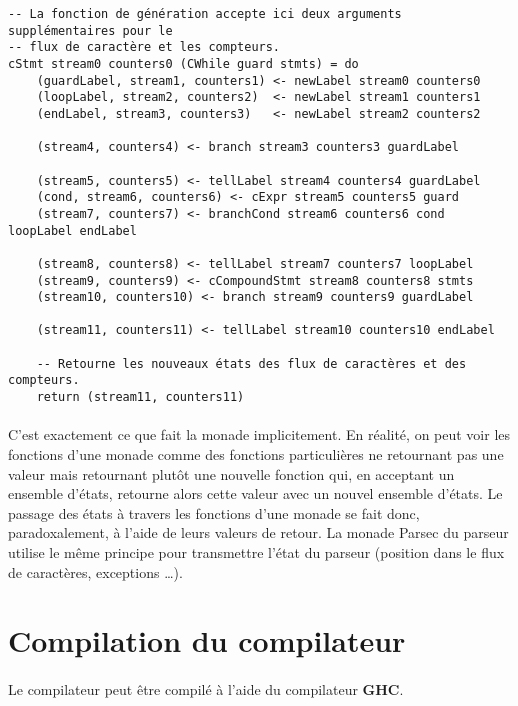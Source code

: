 \documentclass[a4paper]{article}
\begin{document}
    \begin{verbatim}
-- La fonction de génération accepte ici deux arguments supplémentaires pour le
-- flux de caractère et les compteurs.
cStmt stream0 counters0 (CWhile guard stmts) = do
    (guardLabel, stream1, counters1) <- newLabel stream0 counters0
    (loopLabel, stream2, counters2)  <- newLabel stream1 counters1
    (endLabel, stream3, counters3)   <- newLabel stream2 counters2

    (stream4, counters4) <- branch stream3 counters3 guardLabel

    (stream5, counters5) <- tellLabel stream4 counters4 guardLabel
    (cond, stream6, counters6) <- cExpr stream5 counters5 guard
    (stream7, counters7) <- branchCond stream6 counters6 cond loopLabel endLabel

    (stream8, counters8) <- tellLabel stream7 counters7 loopLabel
    (stream9, counters9) <- cCompoundStmt stream8 counters8 stmts
    (stream10, counters10) <- branch stream9 counters9 guardLabel

    (stream11, counters11) <- tellLabel stream10 counters10 endLabel

    -- Retourne les nouveaux états des flux de caractères et des compteurs.
    return (stream11, counters11)
    \end{verbatim}

    \paragraph{}C'est exactement ce que fait la monade implicitement.
En réalité, on peut voir les fonctions d'une monade comme des fonctions
particulières ne retournant pas une valeur mais retournant plutôt une nouvelle
fonction qui, en acceptant un ensemble d'états, retourne alors cette valeur avec
un nouvel ensemble d'états. Le passage des états à travers les fonctions d'une
monade se fait donc, paradoxalement, à l'aide de leurs valeurs de
retour. La monade Parsec du parseur utilise le même principe pour transmettre
l'état du parseur (position dans le flux de caractères, exceptions \dots).

\newpage

 \section{Compilation du compilateur}

    \paragraph{}Le compilateur peut être compilé à l'aide du compilateur
\textbf{GHC}.
\end{document}
